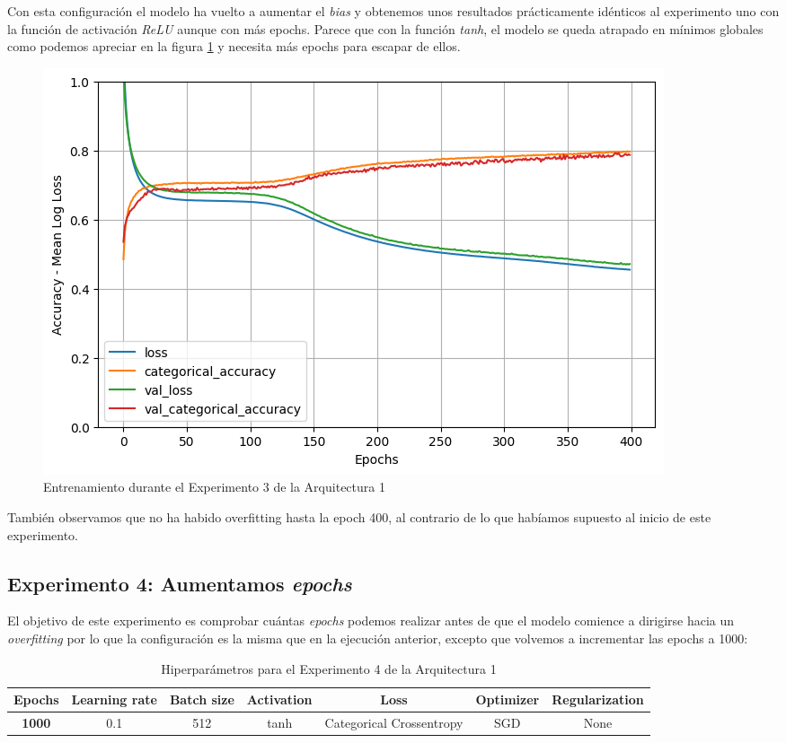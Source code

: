 \documentclass{article}
\begin{document}
			Con esta configuraci\'on el modelo ha vuelto a aumentar el \textit{bias} y obtenemos unos resultados pr\'acticamente id\'enticos al experimento uno con la funci\'on de activaci\'on \textit{ReLU} aunque con m\'as epochs. Parece que con la funci\'on \textit{tanh}, el modelo se queda atrapado en m\'inimos globales como podemos apreciar en la figura \ref{d-tr-a1-e3} y necesita m\'as epochs para escapar de ellos.\\
			
			\begin{figure}[!h]
				\begin{center}
					\includegraphics[scale=0.5]{d-tr-a1-e3.png}		
					\caption{Entrenamiento durante el Experimento 3 de la Arquitectura 1}	
					\label{d-tr-a1-e3}
				\end{center}
			\end{figure}
			
			Tambi\'en observamos que no ha habido overfitting hasta la epoch 400, al contrario de lo que hab\'iamos supuesto al inicio de este experimento.
			
		\subsection{Experimento 4: Aumentamos \textit{epochs}}
		\label{d-s-a1-e4}
			El objetivo de este experimento es comprobar cu\'antas \textit{epochs} podemos realizar antes de que el modelo comience a dirigirse hacia un \textit{overfitting} por lo que la configuraci\'on es la misma que en la ejecuci\'on anterior, excepto que volvemos a incrementar las epochs a 1000:
			\begin{table}[!h]
				\begin{center}
					\begin{tabular}{| c | c | c | c | c | c | c |}
						\textbf{Epochs} & \textbf{Learning rate} & \textbf{Batch size} & \textbf{Activation} & \textbf{Loss} & \textbf{Optimizer} & \textbf{Regularization} \\ \hline
						\textbf{1000} & 0.1 & 512 & tanh & Categorical Crossentropy & SGD & None
					\end{tabular}
					\caption{Hiperpar\'ametros para el Experimento 4 de la Arquitectura 1}
					\label{tab:hip-d-a1-e4}
				\end{center}
			\end{table}
			
\end{document}
